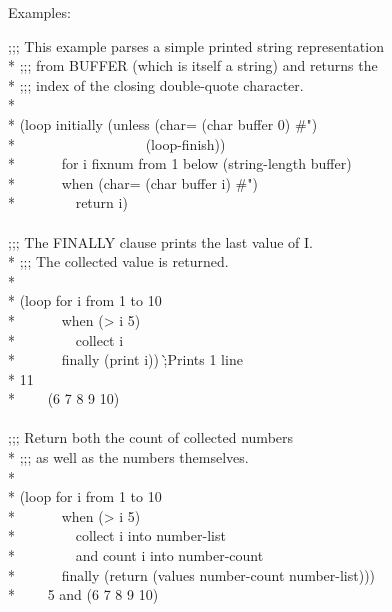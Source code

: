 \begin{defloop}
Examples:
\begin{lisp}
;;; This example parses a simple printed string representation  \\*
;;; from BUFFER (which is itself a string) and returns the \\*
;;; index of the closing double-quote character. \\*
\\*
(loop initially (unless (char= (char buffer 0) \#{\Xbackslash}") \\*
~~~~~~~~~~~~~~~~~~(loop-finish)) \\*
~~~~~~for i fixnum from 1 below (string-length buffer) \\*
~~~~~~when (char= (char buffer i) \#{\Xbackslash}") \\*
~~~~~~~~return i) \\
 \\
;;; The FINALLY clause prints the last value of I. \\*
;;; The collected value is returned. \\*
\\*
(loop for i from 1 to 10 \\*
~~~~~~when (> i 5) \\*
~~~~~~~~collect i \\*
~~~~~~finally (print i)) \`;{\rm Prints 1 line}\\*
11 \\*
~~~\EV~(6 7 8 9 10) \\
 \\
;;; Return both the count of collected numbers \\*
;;; as well as the numbers themselves. \\*
\\*
(loop for i from 1 to 10 \\*
~~~~~~when (> i 5) \\*
~~~~~~~~collect i into number-list \\*
~~~~~~~~and count i into number-count \\*
~~~~~~finally (return (values number-count number-list))) \\*
~~~\EV~5 {\rm and} (6 7 8 9 10)
\end{lisp}
\end{defloop}

